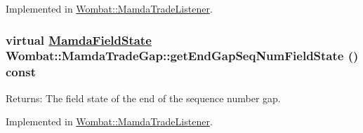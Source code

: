Implemented in \hyperlink{classWombat_1_1MamdaTradeListener_44737862aaa29034fd1b42173dae3a5d}{Wombat::Mamda\-Trade\-Listener}.\hypertarget{classWombat_1_1MamdaTradeGap_9b5d0283e086dd58e28f871c756ddca5}{
\subsubsection[getEndGapSeqNumFieldState]{\setlength{\rightskip}{0pt plus 5cm}virtual \hyperlink{namespaceWombat_93aac974f2ab713554fd12a1fa3b7d2a}{Mamda\-Field\-State} Wombat::Mamda\-Trade\-Gap::get\-End\-Gap\-Seq\-Num\-Field\-State () const}}
\label{classWombat_1_1MamdaTradeGap_9b5d0283e086dd58e28f871c756ddca5}


\begin{Desc}
\item[Returns:]The field state of the end of the sequence number gap. \end{Desc}


Implemented in \hyperlink{classWombat_1_1MamdaTradeListener_dccea0e36079c7120b9d63506b0f0543}{Wombat::Mamda\-Trade\-Listener}.